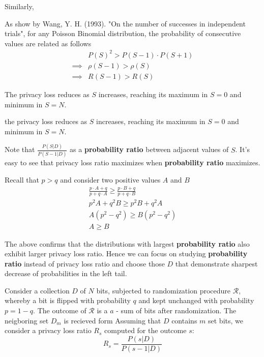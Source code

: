 \documentclass[11pt]{article}
\newcommand{\cR}{\mathcal{R}}
\begin{document}
Similarly, 
 
 
 As show by Wang, Y. H. (1993). "On the number of successes in independent trials", for any Poisson Binomial distribution, the probability of consecutive values are related as follows
 \begin{align*}
 & P(S)^2  > P(S-1) \cdot P(S+1) \\
\implies &  \rho(S-1) > \rho(S) \\
\implies & R(S-1) > R(S)
\end{align*}



\begin{lem} \label{lem:rsreduce}
 The privacy loss reduces as $S$ increases, reaching its maximum in $S=0$ and minimum in $S=N$.
\end{lem}

 the privacy loss reduces as $S$ increases, reaching its maximum in $S=0$ and minimum in $S=N$.







Note that $\frac{P(S | D )}{P(S - 1| D )}$ as a \textbf{probability ratio} between adjacent values of $S$.  It's easy to see that privacy loss ratio maximizes when \textbf{probability ratio} maximizes. 

Recall that $p>q$ and consider two positive values $A$ and $B$ 
\begin{align*}
\frac{ p \cdot A + q } { p + q \cdot A }  \ge \frac{ p \cdot B + q } { p + q \cdot B } \\
p^2A + q^2B \ge p^2 B + q^2 A  \\
A (p^2 - q^2) \ge B (p^2 - q^2)  \\
A \ge B
\end{align*}

The above confirms that the distributions with largest \textbf{probability ratio} also exhibit larger privacy loss ratio. Hence we can focus on studying \textbf{probability ratio}  instead of privacy loss ratio and choose those $D$ that demonstrate sharpest decrease of probabilities in the left tail.




Consider a collection $D$ of $N$ bits, subjected to randomization procedure $\cR$, whereby a bit is flipped with probability $q$ and kept unchanged with probability $p=1-q$.  The outcome of $\cR$ is a $a$ - sum of bits after randomization. The neigboring set $D_m$ is recieved form Assuming that $D$ contains $m$ set bits, we consider a privacy loss ratio $R_s$ computed for the outcome $s$:
\[ R_s = \frac{P(s|D)}{P(s-1|D)} \] 
\end{document}
